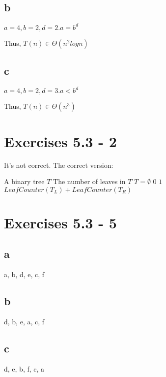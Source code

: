 \documentclass{article}
\begin{document}
\subsection*{b}

$a = 4, b=2, d = 2. a = b^d$

Thus, $T(n) \in \Theta(n^2logn)$

\subsection*{c}

$a = 4, b = 2, d = 3. a < b^d$

Thus, $T(n) \in \Theta(n^3)$

\section{Exercises 5.3 - 2}

It's not correct. The correct version:

\begin{center}
\begin{algorithmic}
\INPUT
A binary tree $T$
\OUTPUT
The number of leaves in $T$
\If $T = \emptyset$
\State \Return $0$
\State \Return $1$
\Else
\State \Return $LeafCounter(T_L) + LeafCounter(T_R)$
\EndIf
\EndFunction
\end{algorithmic}
\end{center}


\section{Exercises 5.3 - 5}

\subsection*{a}

a, b, d, e, c, f

\subsection*{b}

d, b, e, a, c, f

\subsection*{c}

d, e, b, f, c, a
\end{document}
